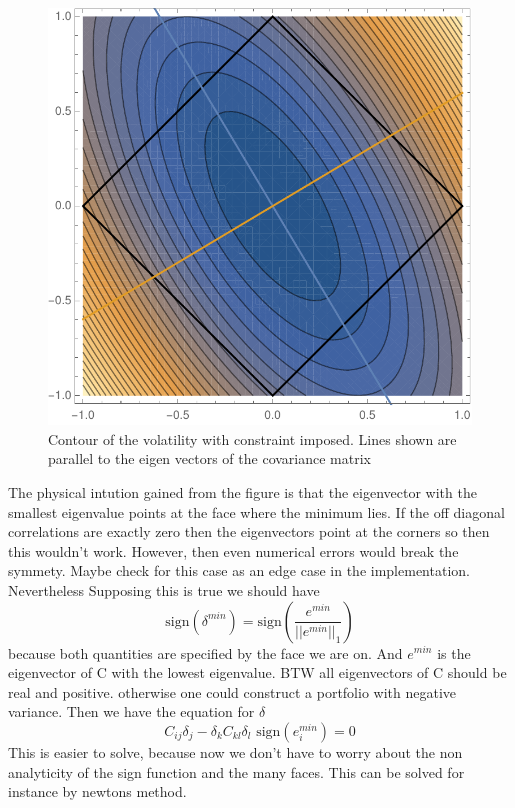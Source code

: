 \documentclass[10pt,letterpaper,oneside]{article}
\begin{document}
\begin{figure}[H]
\includegraphics[scale=1]{concept}
\caption{Contour of the volatility with constraint imposed. Lines shown are parallel to the eigen vectors of the covariance matrix}
\end{figure}

The physical intution gained from the figure is that the eigenvector with the smallest eigenvalue points at the face where the minimum lies. If the off diagonal correlations are exactly zero then the eigenvectors point at the corners so then this wouldn't work. However, then even numerical errors would break the symmety. Maybe check for this case as an edge case in the implementation. Nevertheless Supposing this is true we should have
\begin{equation}
\text{sign}(\delta^{min})=\text{sign}\left(\frac{e^{min}}{||e^{min}||_1}\right)
\end{equation}
because both quantities are specified by the face we are on. And $e^{min}$ is the eigenvector of C with the lowest eigenvalue. BTW all eigenvectors of C should be real and positive. otherwise one could construct a portfolio with negative variance. Then we have the equation for $\delta$
\begin{equation}
C_{i j}\delta_j-\delta_k C_{k l} \delta_l\,\,\text{sign}\left(e^{min}_i\right)=0
\end{equation}
This is easier to solve, because now we don't have to worry about the non analyticity of the sign function and the many faces. This can be solved for instance by newtons method.
\end{document}
